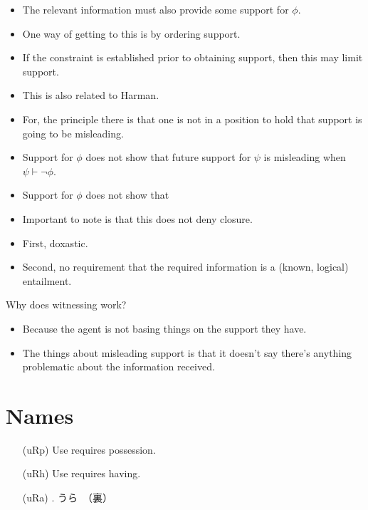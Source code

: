 \documentclass[10pt]{article}
\begin{document}
\begin{itemize}
\item The relevant information must also provide some support for \(\phi\).
\item One way of getting to this is by ordering support.
\item If the constraint is established prior to obtaining support, then this may limit support.
\end{itemize}

\begin{itemize}
\item This is also related to Harman.
\item For, the principle there is that one is not in a position to hold that support is going to be misleading.
\item Support for \(\phi\) does not show that future support for \(\psi\) is misleading when \(\psi \vdash \lnot\phi\).
\item Support for \(\phi\) does not show that 
\end{itemize}

\begin{itemize}
\item Important to note is that this does not deny closure.
\item First, doxastic.
\item Second, no requirement that the required information is a (known, logical) entailment.
\end{itemize}

Why does witnessing work?

\begin{itemize}
\item Because the agent is not basing things on the support they have.
\item The things about misleading support is that it doesn't say there's anything problematic about the information received.
\end{itemize}


\newpage

\section{Names}
\label{sec:names}

\begin{itemize}
\item[(uRp)] Use requires possession.
\item[(uRh)] Use requires having.
\item[(uRa)] \mp{-}.\newline
  うら　（裏）
\end{itemize}
\end{document}
